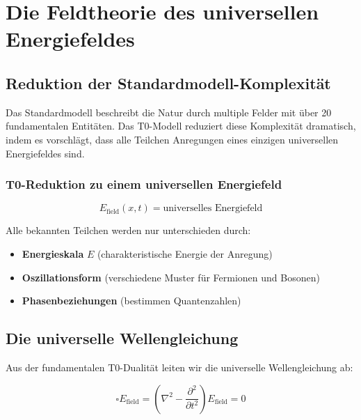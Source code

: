 \documentclass[12pt,a4paper]{report}
\begin{document}
	\chapter{Die Feldtheorie des universellen Energiefeldes}
	\label{chap:universal_field_theory}
	
	\section{Reduktion der Standardmodell-Komplexität}
	\label{sec:sm_complexity}
	
	Das Standardmodell beschreibt die Natur durch multiple Felder mit über 20 fundamentalen Entitäten. Das T0-Modell reduziert diese Komplexität dramatisch, indem es vorschlägt, dass alle Teilchen Anregungen eines einzigen universellen Energiefeldes sind.
	
	\subsection{T0-Reduktion zu einem universellen Energiefeld}
	\label{subsec:t0_reduction}
	
	\begin{equation}
		\boxed{E_{\text{field}}(x,t) = \text{universelles Energiefeld}}
		\label{eq:universal_energy_field}
	\end{equation}
	
	Alle bekannten Teilchen werden nur unterschieden durch:
	\begin{itemize}
		\item \textbf{Energieskala} $E$ (charakteristische Energie der Anregung)
		\item \textbf{Oszillationsform} (verschiedene Muster für Fermionen und Bosonen)
		\item \textbf{Phasenbeziehungen} (bestimmen Quantenzahlen)
	\end{itemize}
	
	\section{Die universelle Wellengleichung}
	\label{sec:universal_wave_equation}
	
	Aus der fundamentalen T0-Dualität leiten wir die universelle Wellengleichung ab:
	
	\begin{equation}
		\boxed{\square E_{\text{field}} = \left(\nabla^2 - \frac{\partial^2}{\partial t^2}\right) E_{\text{field}} = 0}
		\label{eq:universal_wave_equation}
	\end{equation}
	
\end{document}
